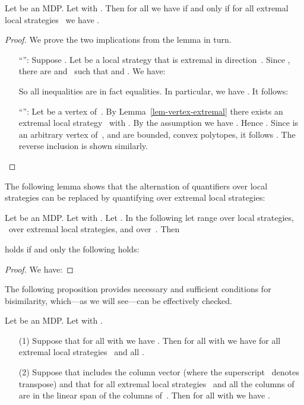\begin{lem}\label{lem-check-extremal-enough}
Let  be an MDP\@.
Let  with .
Then for all  we have  if and only if for all extremal local strategies~ we have .
\end{lem}
\begin{proof}
We prove the two implications from the lemma in turn.
\begin{itemize}[align=left]
\item[``'':]
Suppose .
Let  be a local strategy that is extremal in direction~.
Since , there are  and~ such that
 and
.
We have:

So all inequalities are in fact equalities.
In particular, we have .
It follows:

\item[``'':]
Let  be a vertex of~.
By Lemma~\ref{lem-vertex-extremal} there exists an extremal local strategy~ with .
By the assumption we have .
Hence .
Since  is an arbitrary vertex of~, and  are bounded, convex polytopes, it follows .
The reverse inclusion is shown similarly. \qedhere
\end{itemize}
\end{proof}

\noindent
The following lemma shows that the alternation of quantifiers over local strategies can be replaced by quantifying over extremal local strategies:

\begin{lem}\label{lem-sim-pivot}
Let  be an MDP\@.
Let  with .
Let .
In the following let  range over local strategies, ~over extremal local strategies, and  over~.
Then

holds if and only the following holds:

\end{lem}

\begin{proof}
We have:


\end{proof}

The following proposition provides necessary and sufficient conditions for bisimilarity, which---as we will see---can be effectively checked.

\begin{prop}\label{prop-coNP-vector-space}
Let  be an MDP\@.
Let  with .
\begin{enumerate}
\item[(1)] Suppose that for all  with  we have .
    Then for all  with  we have  for all extremal local strategies~ and all .
\item[(2)] Suppose that  includes the column vector  (where the superscript~ denotes transpose) and that for all extremal local strategies~ and all  the columns of  are in the linear span of the columns of~.
    Then for all  with  we have .
\end{enumerate}
\end{prop}

